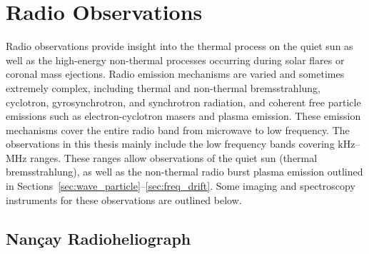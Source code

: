 \section{Radio Observations}\label{sec:3}

Radio observations provide insight into the thermal process on the quiet sun as well as the high-energy non-thermal processes occurring during solar flares or coronal mass ejections. Radio emission mechanisms are varied and sometimes extremely complex, including thermal and non-thermal bremsstrahlung, cyclotron, gyrosynchrotron, and synchrotron radiation, and coherent free particle emissions such as electron-cyclotron masers and plasma emission. These emission mechanisms cover the entire radio band from microwave to low frequency. The observations in this thesis mainly include the low frequency bands covering kHz--MHz ranges. These ranges allow observations of the quiet sun (thermal bremsstrahlung), as well as the non-thermal radio burst plasma emission outlined in Sections~\ref{sec:wave_particle}--\ref{sec:freq_drift}. Some imaging and spectroscopy instruments for these observations are outlined below.


\subsection{Nan\c{c}ay Radioheliograph}\label{sec:33}

